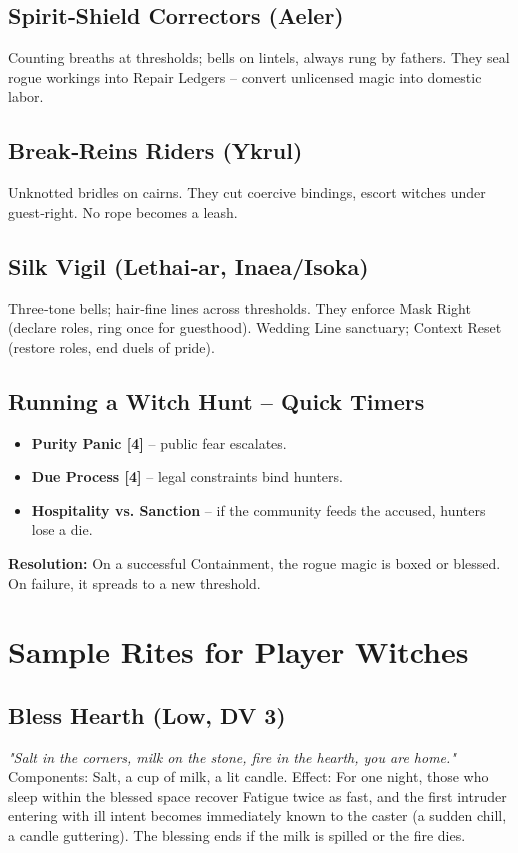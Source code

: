\documentclass[10pt,a5paper]{book}
\begin{document}
\subsection{Spirit‑Shield Correctors (Aeler)}
Counting breaths at thresholds; bells on lintels, always rung by fathers. They seal rogue workings into Repair Ledgers -- convert unlicensed magic into domestic labor.

\subsection{Break‑Reins Riders (Ykrul)}
Unknotted bridles on cairns. They cut coercive bindings, escort witches under guest‑right. No rope becomes a leash.

\subsection{Silk Vigil (Lethai‑ar, Inaea/Isoka)}
Three‑tone bells; hair‑fine lines across thresholds. They enforce Mask Right (declare roles, ring once for guesthood). Wedding Line sanctuary; Context Reset (restore roles, end duels of pride).

\subsection{Running a Witch Hunt -- Quick Timers}
\begin{itemize}
    \item \textbf{Purity Panic [4]} -- public fear escalates.
    \item \textbf{Due Process [4]} -- legal constraints bind hunters.
    \item \textbf{Hospitality vs. Sanction} -- if the community feeds the accused, hunters lose a die.
\end{itemize}
\textbf{Resolution:} On a successful Containment, the rogue magic is boxed or blessed. On failure, it spreads to a new threshold.

\section{Sample Rites for Player Witches}

\subsection*{Bless Hearth (Low, DV 3)}
\textit{"Salt in the corners, milk on the stone, fire in the hearth, you are home."}
Components: Salt, a cup of milk, a lit candle.
Effect: For one night, those who sleep within the blessed space recover Fatigue twice as fast, and the first intruder entering with ill intent becomes immediately known to the caster (a sudden chill, a candle guttering). The blessing ends if the milk is spilled or the fire dies.
\end{document}
